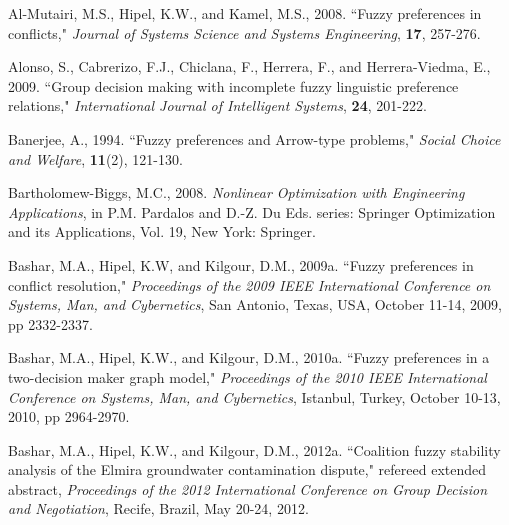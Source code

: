 \documentclass[letterpaper,12pt,titlepage,oneside,final]{book}
\let\origdoublepage\cleardoublepage
\newcommand{\clearemptydoublepage}{%
  \clearpage{\pagestyle{empty}\origdoublepage}}
\let\cleardoublepage\clearemptydoublepage
\begin{document}










\cleardoublepage
{}
{}

\begin{thebibliography}{}

Al-Mutairi, M.S., Hipel, K.W., and Kamel, M.S., 2008. ``Fuzzy preferences in conflicts," \emph{Journal of Systems Science and Systems Engineering}, {\bf 17}, 257-276.

Alonso, S., Cabrerizo, F.J., Chiclana, F., Herrera, F., and Herrera-Viedma, E., 2009. ``Group decision making with incomplete fuzzy linguistic preference relations," \emph{International Journal of Intelligent Systems}, {\bf 24}, 201-222.

Banerjee, A., 1994. ``Fuzzy preferences and Arrow-type problems," \emph{Social Choice and Welfare}, {\bf 11}(2), 121-130.

Bartholomew-Biggs, M.C., 2008. \emph{Nonlinear Optimization with Engineering Applications}, in P.M. Pardalos and D.-Z. Du Eds. series: Springer Optimization and its Applications, Vol. 19, New York: Springer.

Bashar, M.A., Hipel, K.W, and Kilgour, D.M., 2009a. ``Fuzzy preferences in conflict resolution," \emph{Proceedings of the 2009 IEEE International Conference on Systems, Man, and Cybernetics}, San Antonio, Texas, USA, October 11-14, 2009, pp 2332-2337.

Bashar, M.A., Hipel, K.W., and Kilgour, D.M., 2010a. ``Fuzzy preferences in a two-decision maker graph model," \emph{Proceedings of the 2010 IEEE International Conference on Systems, Man, and Cybernetics}, Istanbul, Turkey, October 10-13, 2010, pp 2964-2970.

Bashar, M.A., Hipel, K.W., and Kilgour, D.M., 2012a. ``Coalition fuzzy stability analysis of the Elmira groundwater contamination dispute," refereed extended abstract, \emph{Proceedings of the 2012 International Conference on Group Decision and Negotiation}, Recife, Brazil, May 20-24, 2012.


\end{thebibliography}
\end{document}
